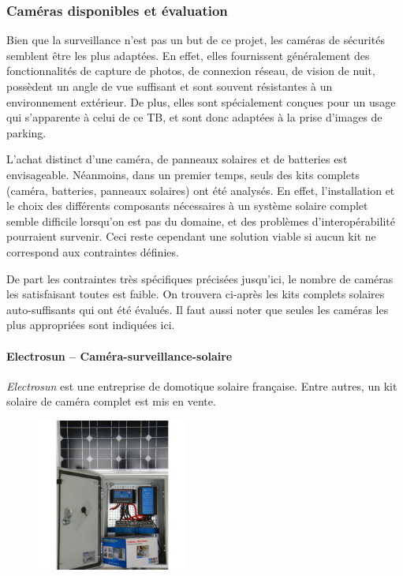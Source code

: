 \subsubsection{Caméras disponibles et évaluation}
Bien que la surveillance n'est pas un but de ce projet, les caméras de sécurités semblent être les plus adaptées. En effet, elles fournissent généralement des fonctionnalités de capture de photos, de connexion réseau, de vision de nuit, possèdent un angle de vue suffisant et sont souvent résistantes à un environnement extérieur. De plus, elles sont spécialement conçues pour un usage qui s'apparente à celui de ce TB, et sont donc adaptées à la prise d'images de parking.

L'achat distinct d'une caméra, de panneaux solaires et de batteries est envisageable. Néanmoins, dans un premier temps, seuls des kits complets (caméra, batteries, panneaux solaires) ont été analysés. En effet, l'installation et le choix des différents composants nécessaires à un système solaire complet semble difficile lorsqu'on est pas du domaine, et des problèmes d'interopérabilité pourraient survenir. Ceci reste cependant une solution viable si aucun kit ne correspond aux contraintes définies.

De part les contraintes très spécifiques précisées jusqu'ici, le nombre de caméras les satisfaisant toutes est faible. On trouvera ci-après les kits complets solaires auto-suffisants qui ont été évalués. Il faut aussi noter que seules les caméras les plus appropriées sont indiquées ici.

\paragraph{\textbf{Electrosun} -- Caméra-surveillance-solaire}
\textit{Electrosun} est une entreprise de domotique solaire française. Entre autres, un kit solaire de caméra complet est mis en vente. \autocite{cam:electrosun_site}

\begin{figure}[ht]
    \includegraphics[width=50mm]{img/conception/electrosun_cam.jpg}
    \centering
\end{figure}

